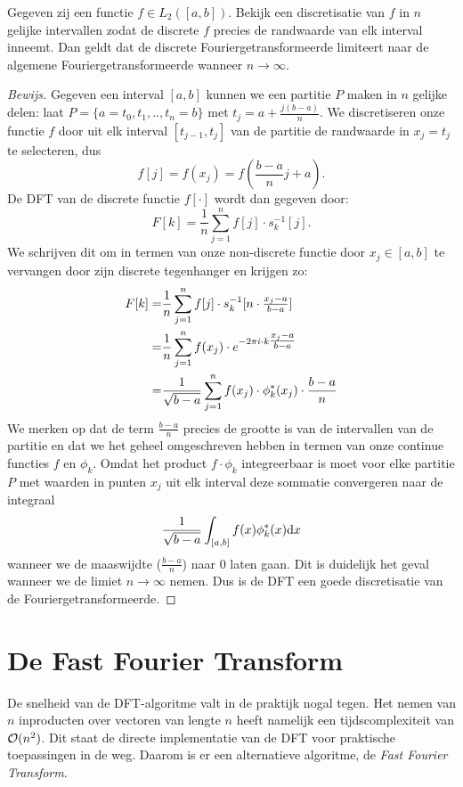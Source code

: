 \begin{stelling}
  Gegeven zij een functie $f\in L_2([a,b])$. Bekijk een discretisatie van $f$ in $n$ gelijke intervallen zodat de discrete $f$ precies 
  de randwaarde van elk interval inneemt.
  Dan geldt dat de discrete Fouriergetransformeerde limiteert naar de algemene Fouriergetransformeerde wanneer $n\to\infty$.
\end{stelling} 
\begin{proof}[Bewijs]
Gegeven een interval $[a,b]$ kunnen we een partitie $P$ maken in $n$ gelijke delen: laat $P=\{a=t_0,t_1,..,t_n=b\}$ met $t_j = a+\tfrac{j(b-a)}{n}$.
We discretiseren onze functie $f$ door uit elk interval $[t_{j-1},t_{j}]$ van de partitie de randwaarde in 
$x_j = t_j$ te selecteren, dus
\[
f[j] = f(x_j) = f(\frac{b-a}{n}j + a).
\]
De DFT van de discrete functie $f[\cdot]$ wordt dan gegeven door:
\[
F[k] = \frac1n\sum_{j=1}^n f[j] \cdot s_k^{-1}[j].
\]
We schrijven dit om in termen van onze non-discrete functie door $x_j\in[a,b]$ 
te vervangen door zijn discrete tegenhanger en krijgen zo:
\begin{eqnarray*}
  F[k] =& \frac{1}{n} \sum_{j=1}^n f[j]\cdot s_k^{-1}[n\cdot\tfrac{x_j-a}{b-a}] \\
       =& \frac{1}{n} \sum_{j=1}^n f(x_j)\cdot e^{-{2\pi i} \cdot k \tfrac{x_j-a}{b-a}}\\
       =&  \frac{1}{\sqrt{b-a}}\sum_{j=1}^n f(x_j)\cdot \phi^*_k(x_j) \cdot\frac{b-a}{n} 
\end{eqnarray*}
We merken op dat de term $\frac{b-a}{n}$ precies de grootte is van de intervallen van de partitie 
en dat we het geheel omgeschreven hebben in termen van onze continue functies $f$ en $\phi_k$.
Omdat het product $f\cdot\phi_k$ integreerbaar is moet voor elke partitie $P$ met 
waarden in punten $x_j$ uit elk interval deze sommatie convergeren naar de integraal
\[
  \frac{1}{\sqrt{b-a}} \int_{[a,b]} f(x) \phi^*_k(x) {\mathrm{d} x}
\]
wanneer we de maaswijdte ($\tfrac{b-a}{n}$) naar $0$ laten gaan. \cite{shilov}
Dit is duidelijk het geval wanneer we de limiet $n\to\infty$ nemen. 
Dus is de DFT een goede discretisatie van de Fouriergetransformeerde. 
\end{proof}

\section{De Fast Fourier Transform}
\label{fft_sec}
De snelheid van de DFT-algoritme valt in de praktijk nogal tegen. Het nemen van $n$ inproducten over vectoren 
van lengte $n$ heeft namelijk een tijdscomplexiteit van $\mathcal{O}(n^2)$. Dit staat de directe implementatie van de DFT 
voor praktische toepassingen in de weg. Daarom is er een alternatieve algoritme, de \emph{Fast Fourier Transform}.

